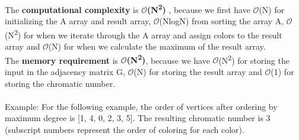 \documentclass[12pt]{article}
\begin{document}
\indent The {\bf computational complexity} is {\bf $\mathcal{O}$(N\textsuperscript{2}) }, because we first have $\mathcal{O}$(N) for initializing the A array and result array, $\mathcal{O}$(NlogN) from sorting the array A, $\mathcal{O}$(N\textsuperscript{2}) for when we iterate through the A array and assign colors to the result array and $\mathcal{O}$(N) for when we calculate the maximum of the result array. \quad \\
\indent The {\bf memory requirement} is {\bf $\mathcal{O}$(N\textsuperscript{2})}, because we have $\mathcal{O}$(N\textsuperscript{2}) for storing the input in the adjacency matrix G, $\mathcal{O}$(N) for storing the result array and $\mathcal{O}$(1) for storing the chromatic number. \\ \\ Example: For the following example, the order of vertices after ordering by maximum degree is [1, 4, 0, 2, 3, 5]. The resulting chromatic number is 3 (subscript numbers represent the order of coloring for each color).  \\
\end{document}
